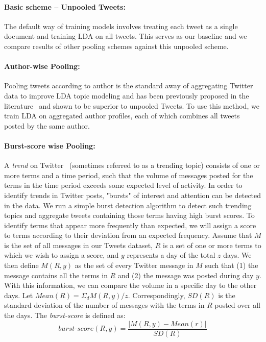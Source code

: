 \documentclass[10pt,a5paper,twoside]{article}
\begin{document}
\paragraph{Basic scheme -- Unpooled Tweets:}

The default way of training models involves treating each tweet as a
single document and training LDA on all tweets. This serves as our
baseline and we compare results of other pooling schemes against this
unpooled scheme. 

\paragraph{Author-wise Pooling: }

Pooling tweets according to author is the standard away of aggregating
Twitter data to improve LDA topic modeling and has been previously
proposed in the literature~\cite{Weng2010wsdm,hong} and shown to be
superior to unpooled Tweets.  To use this method, we train LDA on
aggregated author profiles, each of which combines all tweets posted
by the same author.  

\paragraph{Burst-score wise Pooling:}

A \textit{trend} on Twitter~\cite{mor} (sometimes referred to as a trending
topic) consists of one or more terms and a time period, such that the
volume of messages posted for the terms in the time period exceeds
some expected level of activity.  In order to identify trends in
Twitter posts, "bursts" of interest and attention can be detected in
the data. We run a simple burst detection algorithm to detect such
trending topics and aggregate tweets containing those terms having
high burst scores.  To identify terms that appear more frequently than
expected, we will assign a score to terms according to their deviation
from an expected frequency. Assume that $M$ is the set of all messages
in our Tweets dataset, $R$ is a set of one or more terms to which we
wish to assign a score, and $y$ represents a day of the total $z$
days. We then define $M(R, y)$ as the set of every Twitter message in
$M$ such that (1) the message contains all the terms in $R$ and (2)
the message was posted during day $y$. With this information, we can
compare the volume in a specific day to the other days. Let $ Mean(R)
= \Sigma_d M(R,y) / z $.  Correspondingly, $ SD(R) $ is the standard
deviation of the number of messages with the terms in $R$ posted over
all the days. The \textit{burst-score} is defined as:
\[
\mathit{burst\textrm{-}score}(R,y) = \frac{|M(R,y) - Mean(r)|}{SD(R)} 
\]
\end{document}
